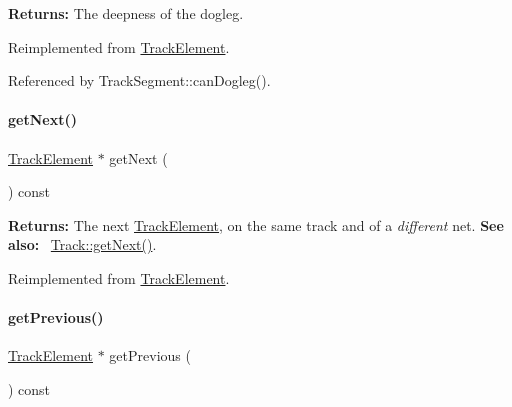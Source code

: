 {\bfseries Returns\+:} The deepness of the dogleg. 

Reimplemented from \mbox{\hyperlink{classKite_1_1TrackElement_add78c6f914788c549f144998caacda84}{Track\+Element}}.



Referenced by Track\+Segment\+::can\+Dogleg().

\mbox{\label{classKite_1_1TrackSegment_a010b7fc8801c5b88aefa4137cf85186d}} 
\paragraph{\texorpdfstring{get\+Next()}{getNext()}}
{\footnotesize\ttfamily \mbox{\hyperlink{classKite_1_1TrackElement}{Track\+Element}} $\ast$ get\+Next (\begin{DoxyParamCaption}{ }\end{DoxyParamCaption}) const\hspace{0.3cm}{\ttfamily [virtual]}}

{\bfseries Returns\+:} The next \mbox{\hyperlink{classKite_1_1TrackElement}{Track\+Element}}, on the same track and of a {\itshape different} net. {\bfseries See also\+:}~ \mbox{\hyperlink{classKite_1_1Track_af3db59591bef3c690ace92c114a4e4aa}{Track\+::get\+Next()}}. 

Reimplemented from \mbox{\hyperlink{classKite_1_1TrackElement_a010b7fc8801c5b88aefa4137cf85186d}{Track\+Element}}.

\mbox{\label{classKite_1_1TrackSegment_a55d6115d84c11ad147f4c38fe372ea24}} 
\paragraph{\texorpdfstring{get\+Previous()}{getPrevious()}}
{\footnotesize\ttfamily \mbox{\hyperlink{classKite_1_1TrackElement}{Track\+Element}} $\ast$ get\+Previous (\begin{DoxyParamCaption}{ }\end{DoxyParamCaption}) const\hspace{0.3cm}{\ttfamily [virtual]}}

